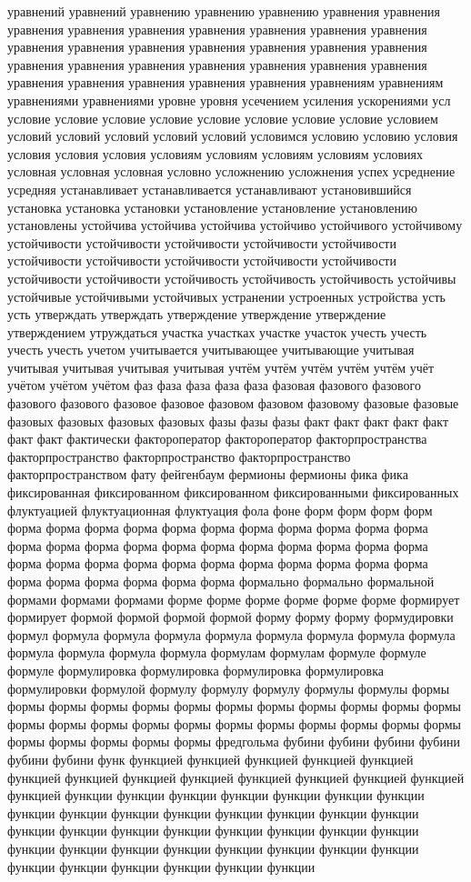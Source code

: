 уравнений уравнений уравнению уравнению уравнению уравнения уравнения уравнения уравнения уравнения уравнения уравнения уравнения уравнения уравнения уравнения уравнения уравнения уравнения уравнения уравнения уравнения уравнения уравнения уравнения уравнения уравнения уравнения уравнения уравнения уравнения уравнения уравнения уравнениям уравнениям уравнениями уравнениями уровне уровня усечением усиления ускорениями усл условие условие условие условие условие условие условие условие условием условий условий условий условий условий условимся условию условию условия условия условия условия условиям условиям условиям условиям условиях условная условная условная условно усложнению усложнения успех усреднение усредняя устанавливает устанавливается устанавливают установившийся установка установка установки установление установление установлению установлены устойчива устойчива устойчива устойчиво устойчивого устойчивому устойчивости устойчивости устойчивости устойчивости устойчивости устойчивости устойчивости устойчивости устойчивости устойчивости устойчивости устойчивости устойчивость устойчивость устойчивость устойчивы устойчивые устойчивыми устойчивых устранении устроенных устройства усть усть утверждать утверждать утверждение утверждение утверждение утверждением утруждаться участка участках участке участок учесть учесть учесть учесть учетом учитывается учитывающее учитывающие учитывая учитывая учитывая учитывая учитывая учтём учтём учтём учтём учтём учёт учётом учётом учётом фаз фаза фаза фаза фаза фазовая фазового фазового фазового фазового фазовое фазовое фазовом фазовом фазовому фазовые фазовые фазовых фазовых фазовых фазовых фазы фазы фазы факт факт факт факт факт факт факт фактически фактороператор фактороператор факторпространства факторпространство факторпространство факторпространство факторпространством фату фейгенбаум фермионы фермионы фика фика фиксированная фиксированном фиксированном фиксированными фиксированных флуктуацией флуктуационная флуктуация фола фоне форм форм форм форм форма форма форма форма форма форма форма форма форма форма форма форма форма форма форма форма форма форма форма форма форма форма форма форма форма форма форма форма форма форма форма форма форма форма форма форма форма форма форма формально формально формальной формами формами формами форме форме форме форме форме форме формирует формирует формой формой формой формой форму форму форму формудировки формул формула формула формула формула формула формула формула формула формула формула формула формула формулам формулам формуле формуле формуле формулировка формулировка формулировка формулировка формулировки формулой формулу формулу формулу формулы формулы формы формы формы формы формы формы формы формы формы формы формы формы формы формы формы формы формы формы формы формы формы формы формы формы формы формы формы формы фредгольма фубини фубини фубини фубини фубини фубини функ функцией функцией функцией функцией функцией функцией функцией функцией функцией функцией функцией функцией функцией функцией функции функции функции функции функции функции функции функции функции функции функции функции функции функции функции функции функции функции функции функции функции функции функции функции функции функции функции функции функции функции функции функции функции функции функции функции функции 